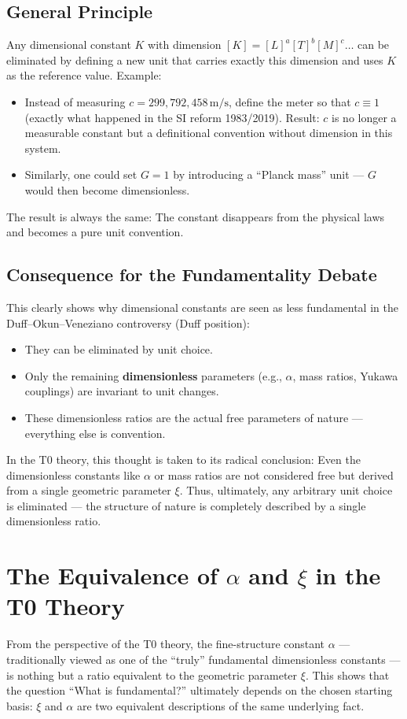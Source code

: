 	\subsection{General Principle}
	Any dimensional constant $K$ with dimension $[K] = [L]^a [T]^b [M]^c \dots$ can be eliminated by defining a new unit that carries exactly this dimension and uses $K$ as the reference value.
	Example:
	\begin{itemize}
		\item Instead of measuring $c = 299{,}792{,}458\,\text{m/s}$, define the meter so that $c \equiv 1$ (exactly what happened in the SI reform 1983/2019).
		Result: $c$ is no longer a measurable constant but a definitional convention without dimension in this system.
		\item Similarly, one could set $G = 1$ by introducing a ``Planck mass'' unit --- $G$ would then become dimensionless.
	\end{itemize}
	The result is always the same: The constant disappears from the physical laws and becomes a pure unit convention.
	
	\subsection{Consequence for the Fundamentality Debate}
	This clearly shows why dimensional constants are seen as less fundamental in the Duff--Okun--Veneziano controversy (Duff position):
	\begin{itemize}
		\item They can be eliminated by unit choice.
		\item Only the remaining \textbf{dimensionless} parameters (e.g., $\alpha$, mass ratios, Yukawa couplings) are invariant to unit changes.
		\item These dimensionless ratios are the actual free parameters of nature --- everything else is convention.
	\end{itemize}
	In the T0 theory, this thought is taken to its radical conclusion: Even the dimensionless constants like $\alpha$ or mass ratios are not considered free but derived from a single geometric parameter $\xi$. Thus, ultimately, any arbitrary unit choice is eliminated --- the structure of nature is completely described by a single dimensionless ratio.
	
	\section{The Equivalence of $\alpha$ and $\xi$ in the T0 Theory}
	From the perspective of the T0 theory, the fine-structure constant $\alpha$ --- traditionally viewed as one of the ``truly'' fundamental dimensionless constants --- is nothing but a ratio equivalent to the geometric parameter $\xi$. This shows that the question ``What is fundamental?'' ultimately depends on the chosen starting basis: $\xi$ and $\alpha$ are two equivalent descriptions of the same underlying fact.
	
